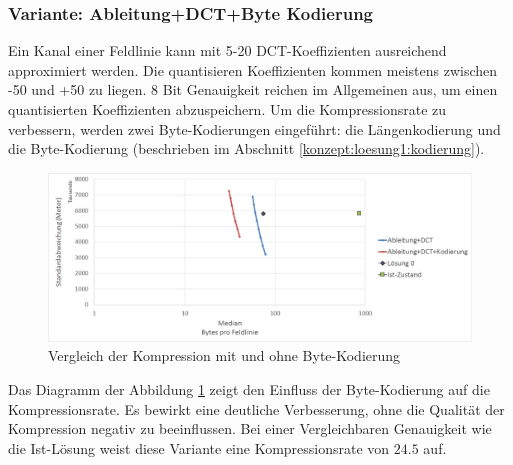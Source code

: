 \subsubsection{Variante: Ableitung+DCT+Byte Kodierung} \label{resultate:loesung1:ableitung_dct_kodierung}
Ein Kanal einer Feldlinie kann mit 5-20 DCT-Koeffizienten ausreichend approximiert werden. Die quantisieren Koeffizienten kommen meistens zwischen -50 und +50 zu liegen. 8 Bit Genauigkeit reichen im Allgemeinen aus, um einen quantisierten Koeffizienten abzuspeichern. Um die Kompressionsrate zu verbessern, werden zwei Byte-Kodierungen eingeführt: die Längenkodierung und die Byte-Kodierung (beschrieben im Abschnitt \ref{konzept:loesung1:kodierung}).\\
\begin{figure}[!htbp]
	\center
	\includegraphics[width=1\textwidth,keepaspectratio]{./pictures/resultate/loesung1/loesung1-6/loesung1_6.png}
	\caption{Vergleich der Kompression mit und ohne Byte-Kodierung}
	\label{resultate:loesung1:dct:kodierung}
\end{figure}
Das Diagramm der Abbildung \ref{resultate:loesung1:dct:kodierung} zeigt den Einfluss der Byte-Kodierung auf die Kompressionsrate. Es bewirkt eine deutliche Verbesserung, ohne die Qualität der Kompression negativ zu beeinflussen. Bei einer Vergleichbaren Genauigkeit wie die Ist-Lösung weist diese Variante eine Kompressionsrate von $24.5$ auf.

